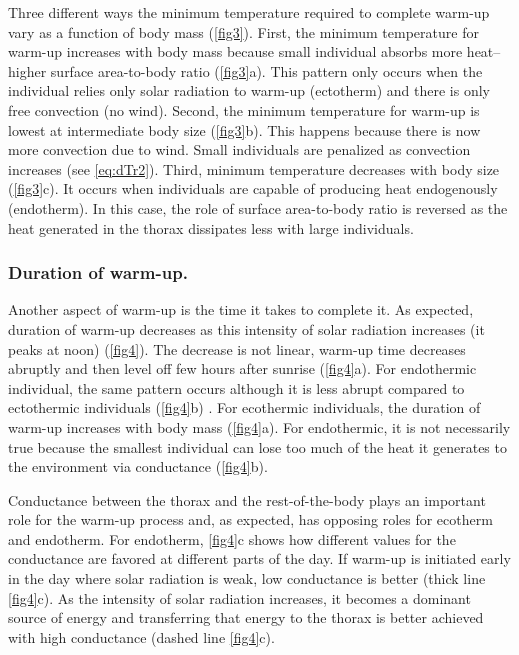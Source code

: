 Three different ways the minimum temperature required to complete warm-up vary as a function of body mass (\cref{fig3}).
First, the minimum temperature for warm-up increases with body mass because small individual absorbs more heat--higher surface area-to-body ratio (\cref{fig3}a).
This pattern only occurs when the individual relies only solar radiation to warm-up (ectotherm) and there is only free convection (no wind).
Second, the minimum temperature for warm-up is lowest at intermediate body size (\cref{fig3}b). 
This happens because there is now more convection due to wind. 
Small individuals are  penalized as convection increases (see \cref{eq:dTr2}).
Third, minimum temperature decreases with body size (\cref{fig3}c).
It occurs when individuals are capable of producing heat endogenously (endotherm).
In this case, the role of surface area-to-body ratio is reversed as the heat generated in the thorax dissipates less with large individuals.

\subsubsection*{Duration of warm-up.}
Another aspect of warm-up is the time it takes to complete it.
As expected, duration of warm-up decreases as this intensity of solar radiation increases (it peaks at noon) (\cref{fig4}).
The decrease is not linear, warm-up time decreases abruptly and then level off few hours after sunrise (\cref{fig4}a).
For endothermic individual, the same pattern occurs although it is less abrupt compared to ectothermic individuals (\cref{fig4}b) .
For ecothermic individuals, the duration of warm-up increases with body mass (\cref{fig4}a).
For endothermic, it is not necessarily true because the smallest individual can lose too much of the heat it generates to the environment via conductance (\cref{fig4}b).

Conductance between the thorax and the rest-of-the-body plays an important role for the warm-up process and, as expected, has opposing roles for ecotherm and endotherm.
For endotherm, \cref{fig4}c shows how different values for the conductance are favored at different parts of the day.
If warm-up is initiated early in the day where solar radiation is weak, low conductance is better (thick line \cref{fig4}c).
As the intensity of solar radiation increases, it becomes a dominant source of energy and transferring that energy to the thorax is better achieved with high conductance (dashed line \cref{fig4}c).

